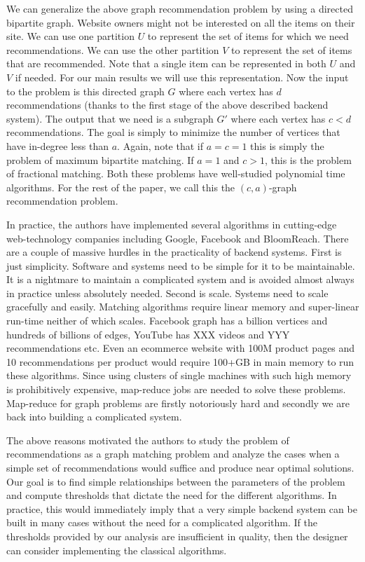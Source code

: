 We can generalize the above graph recommendation problem by using a directed bipartite graph.
Website owners might not be interested on all the items on their site. We can use one partition $U$
to represent the set of items for which we need recommendations. We can use the other partition $V$
to represent the set of items that are recommended. Note that a single item can be represented in
both $U$ and $V$ if needed. For our main results we will use this representation. Now the input
to the problem is this directed graph $G$ where each vertex has $d$ recommendations (thanks to the
first stage of the above described backend system). The output that we need is a subgraph $G'$
where each vertex has $c < d$ recommendations. The goal is simply to minimize the number of vertices
that have in-degree less than $a$. Again, note that if $a=c=1$ this is simply the problem of
maximum bipartite matching\cite{}. If $a=1$ and $c > 1$, this is the problem of fractional
matching\cite{}. Both these problems have well-studied polynomial time algorithms\cite{}. For the
rest of the paper, we call this the $(c, a)$-graph recommendation problem. \vs

In practice, the authors have implemented several algorithms in cutting-edge web-technology companies
including Google, Facebook and BloomReach. There are a couple of massive hurdles in the practicality
of backend systems. First is just simplicity. Software and systems need to be simple for it to be
maintainable. It is a nightmare to maintain a complicated system and is avoided almost always
in practice unless absolutely needed. Second is scale. Systems need to scale gracefully and easily. Matching
algorithms require linear memory and super-linear run-time neither of which scales. Facebook graph has
a billion vertices\cite{} and hundreds of billions of edges\cite{},
YouTube has XXX videos and YYY recommendations\cite{} etc. Even an ecommerce website with 100M product
pages and 10 recommendations per product would require 100+GB in main memory to run these algorithms. Since
using clusters of single machines with such high memory is prohibitively expensive, map-reduce\cite{} jobs
are needed to solve these problems. Map-reduce for graph problems are firstly notoriously hard and secondly
we are back into building a complicated system. \vs

The above reasons motivated the authors to study the problem of recommendations as a graph matching
problem and analyze the cases when a simple set of recommendations would suffice and produce near optimal
solutions. Our goal is to find simple relationships between the parameters of the problem and compute
thresholds that dictate the need for the different algorithms. In practice, this would immediately imply
that a very simple backend system can be built in many cases without the need for a complicated algorithm.
If the thresholds provided by our analysis are insufficient in quality,
then the designer can consider implementing the classical algorithms.


\fi